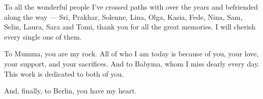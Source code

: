 \begin{acknowledgements}
\par To all the wonderful people I've crossed paths with over the years and befriended along the way — Sri, Prakhar, Solenne, Lina, Olga, Kasia, Fede, Nina, Sam, Selin, Laura, Sara and Tomi, thank you for all the great memories. I will cherish every single one of them.\\

\par To Mumma, you are my rock. All of who I am today is because of you, your love, your support, and your sacrifices. And to Babyma, whom I miss dearly every day. This work is dedicated to both of you.\\

\par And, finally, to Berlin, you have my heart.




%




\end{acknowledgements}
